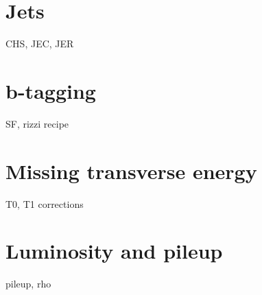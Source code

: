 \section{Jets}

CHS, JEC, JER

\section{b-tagging}

SF, rizzi recipe

\section{Missing transverse energy}

T0, T1 corrections

\section{Luminosity and pileup}

pileup, rho
